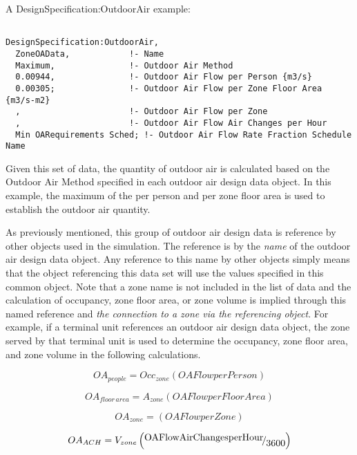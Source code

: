 A DesignSpecification:OutdoorAir example:

\begin{lstlisting}

DesignSpecification:OutdoorAir,
  ZoneOAData,            !- Name
  Maximum,               !- Outdoor Air Method
  0.00944,               !- Outdoor Air Flow per Person {m3/s}
  0.00305;               !- Outdoor Air Flow per Zone Floor Area {m3/s-m2}
  ,                      !- Outdoor Air Flow per Zone
  ,                      !- Outdoor Air Flow Air Changes per Hour
  Min OARequirements Sched; !- Outdoor Air Flow Rate Fraction Schedule Name
\end{lstlisting}

Given this set of data, the quantity of outdoor air is calculated based on the Outdoor Air Method specified in each outdoor air design data object. In this example, the maximum of the per person and per zone floor area is used to establish the outdoor air quantity.

As previously mentioned, this group of outdoor air design data is reference by other objects used in the simulation. The reference is by the \emph{name} of the outdoor air design data object. Any reference to this name by other objects simply means that the object referencing this data set will use the values specified in this common object. Note that a zone name is not included in the list of data and the calculation of occupancy, zone floor area, or zone volume is implied through this named reference and \emph{the connection to a zone via the referencing object}. For example, if a terminal unit references an outdoor air design data object, the zone served by that terminal unit is used to determine the occupancy, zone floor area, and zone volume in the following calculations.

\begin{equation}
O{A_{people}} = Oc{c_{zone}}\left( {OAFlowperPerson} \right)
\end{equation}

\begin{equation}
O{A_{floor\,area}} = {A_{zone}}\left( {OAFlowperFloorArea} \right)
\end{equation}

\begin{equation}
O{A_{zone}} = \left( {OAFlowperZone} \right)
\end{equation}

\begin{equation}
O{A_{ACH}} = {V_{zone}}\left( {{\raise0.7ex\hbox{{OAFlowAirChangesperHour}} \!\mathord{\left/ {\vphantom {{OAFlowAirChangesperHour} {3600}}}\right.}\!\lower0.7ex\hbox{{3600}}}} \right)
\end{equation}

